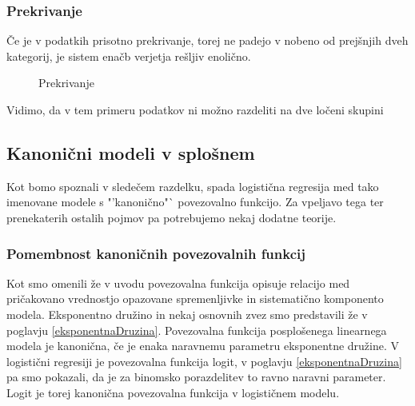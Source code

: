 \documentclass[12pt,a4paper]{amsart}
\theoremstyle{definition} %
\theoremstyle{plain} %
\begin{document}
\subsubsection{Prekrivanje}
Če je v podatkih prisotno prekrivanje, torej ne padejo v nobeno od prejšnjih dveh kategorij, je sistem enačb verjetja rešljiv enolično.
\begin{center}
    \begin{figure}[h!]
    \caption{Prekrivanje}
\end{figure}
\end{center}
Vidimo, da v tem primeru podatkov ni možno razdeliti na dve ločeni skupini

\subsection{Kanonični modeli v splošnem}
Kot bomo spoznali v sledečem razdelku, spada logistična regresija med tako imenovane modele s "'kanonično"` povezovalno funkcijo. 
Za vpeljavo tega ter prenekaterih ostalih pojmov pa potrebujemo nekaj dodatne teorije.

\subsubsection{Pomembnost kanoničnih povezovalnih funkcij}\label{kan}
Kot smo omenili že v uvodu povezovalna funkcija opisuje relacijo med pričakovano vrednostjo opazovane spremenljivke in
sistematično komponento modela. Eksponentno družino in nekaj osnovnih zvez smo predstavili že v poglavju \ref{eksponentnaDruzina}.
Povezovalna funkcija posplošenega linearnega modela je kanonična, če je enaka naravnemu parametru eksponentne družine. V logistični regresiji je povezovalna funkcija logit,
v poglavju \ref{eksponentnaDruzina} pa smo pokazali, da je za binomsko porazdelitev to ravno naravni parameter. Logit je torej kanonična povezovalna funkcija v logističnem modelu.
\end{document}
